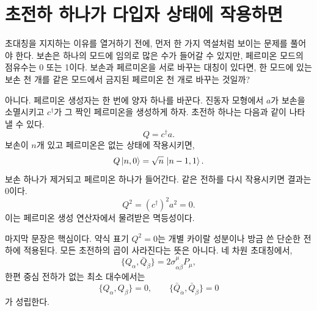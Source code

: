 \section{초전하 하나가 다입자 상태에 작용하면}

초대칭을 지지하는 이유를 열거하기 전에, 먼저 한 가지 역설처럼 보이는 문제를 풀어야 한다. 보손은 하나의 모드에 임의로 많은 수가 들어갈 수 있지만, 페르미온 모드의 점유수는 0 또는 1이다. 보손과 페르미온을 서로 바꾸는 대칭이 있다면, 한 모드에 있는 보손 천 개를 같은 모드에서 금지된 페르미온 천 개로 바꾸는 것일까?

아니다. 페르미온 생성자는 한 번에 양자 하나를 바꾼다. 진동자 모형에서 \(a\)가 보손을 소멸시키고 \(c^\dagger\)가 그 짝인 페르미온을 생성하게 하자. 초전하 하나는 다음과 같이 나타낼 수 있다.
\begin{equation}
Q=c^\dagger a.
\end{equation}
보손이 \(n\)개 있고 페르미온은 없는 상태에 작용시키면,
\begin{equation}
Q\left\lvert n,0\right\rangle
=\sqrt n\,\left\lvert n-1,1\right\rangle.
\end{equation}
보손 하나가 제거되고 페르미온 하나가 들어간다. 같은 전하를 다시 작용시키면 결과는 0이다.
\begin{equation}
Q^2=(c^\dagger)^2a^2=0.
\end{equation}
이는 페르미온 생성 연산자에서 물려받은 멱등성이다.

\begin{classroomqa}
\end{classroomqa}

마지막 문장은 핵심이다. 약식 표기 \(Q^2=0\)는 개별 카이랄 성분이나 방금 쓴 단순한 전하에 적용된다. 모든 초전하의 곱이 사라진다는 뜻은 아니다. 네 차원 초대칭에서,
\begin{equation}
\{Q_\alpha,\bar Q_{\dot\beta}\}
=2\sigma^\mu_{\alpha\dot\beta}P_\mu,
\end{equation}
한편 중심 전하가 없는 최소 대수에서는
\begin{equation}
\{Q_\alpha,Q_\beta\}=0,
\qquad
\{\bar Q_{\dot\alpha},\bar Q_{\dot\beta}\}=0
\end{equation}
가 성립한다.

